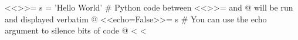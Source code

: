 \documentclass{article}
\begin{document}
<<>>=
s = 'Hello World'   # Python code between <<>>= and @ will be run and displayed verbatim
@
<<echo=False>>=
s                   # You can use the echo argument to silence bits of code
@
<%
<%
\end{document}
